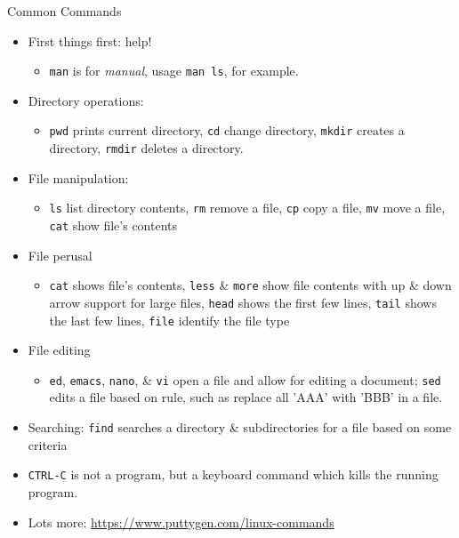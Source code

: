 \documentclass[graphics]{beamer}
\begin{document}
\begin{frame}{Common Commands}
     {
        \begin{itemize}
            \item First things first: help!
            \begin{itemize}
                \item \texttt{man} is for \textit{manual}, usage \texttt{man ls}, for example.
            \end{itemize}
            \item Directory operations:
            \begin{itemize}
                \item \texttt{pwd} prints current directory, \texttt{cd} change directory, \texttt{mkdir} creates a directory, \texttt{rmdir} deletes a directory.
            \end{itemize}
            \item File manipulation:
            \begin{itemize}
                \item \texttt{ls} list directory contents, \texttt{rm} remove a file, \texttt{cp} copy a file, \texttt{mv} move a file, \texttt{cat} show file's contents
            \end{itemize}
            \item File perusal
            \begin{itemize}
                \item \texttt{cat} shows file's contents, \texttt{less} \& \texttt{more} show file contents with up \& down arrow support for large files, \texttt{head} shows the first few lines, \texttt{tail} shows the last few lines, \texttt{file} identify the file type
            \end{itemize}
        \end{itemize}
    }
     {
        \begin{itemize}
            \item File editing
            \begin{itemize}
                \item \texttt{ed}, \texttt{emacs}, \texttt{nano}, \& \texttt{vi} open a file and allow for editing a document; \texttt{sed} edits a file based on rule, such as replace all 'AAA' with 'BBB' in a file.
            \end{itemize}
            \item Searching: \texttt{find} searches a directory \& subdirectories for a file based on some criteria
            \item \texttt{CTRL-C} is not a program, but a keyboard command which kills the running program.
            \item Lots more: \url{https://www.puttygen.com/linux-commands}
        \end{itemize}
    }
\end{frame}
\end{document}

